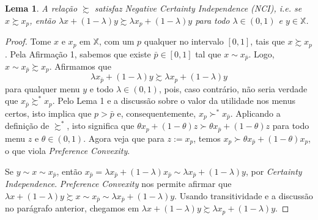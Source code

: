 \documentclass[11pt, a4paper]{article}
\theoremstyle{nonumberplain}
\newtheorem{proof}{Dem.}
\theoremstyle{plain}
\theoremstyle{plain}
\theoremstyle{plain}
\newtheorem{lemma}{Lema}
\begin{document}
\begin{lemma}\label{NCI}A relação $\succsim$ satisfaz \emph{Negative Certainty Independence (NCI)}, i.e. se $x\succsim x_p$, então $\lambda x +(1-\lambda)y\succsim \lambda x_p +(1-\lambda)y$ para todo $\lambda\in(0,1)$ e $y\in \mathbb{X}$.\end{lemma}
\begin{proof}
Tome $x$ e $x_p$ em $\mathbb{X}$, com um $p$ qualquer no intervalo $[0,1]$, tais que $x\succsim x_p$. Pela Afirmação 1, sabemos que existe $\bar{p}\in [0,1]$ tal que $x\sim x_{\bar{p}}$. Logo, $x\sim x_{\bar{p}}\succsim x_p$. Afirmamos que $$\lambda x_{\bar{p}} +(1-\lambda)y\succsim \lambda x_p +(1-\lambda)y$$
para qualquer menu $y$ e todo $\lambda\in (0,1)$, pois, caso contrário, não seria verdade que $x_{\bar{p}}\succsim^*x_p$. Pelo Lema 1 e a discussão sobre o valor da utilidade nos menus certos, isto implica que $p>\bar{p}$ e, consequentemente, $x_p\succ^*x_{\bar{p}}$. Aplicando a definição de $\succsim^*$, isto significa que $\theta x_p + (1-\theta)z\succ \theta x_{\bar{p}}+(1-\theta)z$ para todo menu $z$ e $\theta\in (0,1)$. Agora veja que para $z:=x_p$, temos $x_p\succ \theta x_{\bar{p}} + (1-\theta)x_p$, o que viola \emph{Preference Convexity}.

Se $y\sim x\sim x_{\bar{p}}$, então $x_{\bar{p}}=\lambda x_{\bar{p}} + (1-\lambda)x_{\bar{p}}\sim\lambda x_{\bar{p}}+(1-\lambda)y$, por \emph{Certainty Independence}. \emph{Preference Convexity} nos permite afirmar que $\lambda x+(1-\lambda)y \succsim x \sim x_{\bar{p}} \sim \lambda x_{\bar{p}}+(1-\lambda)y$. Usando transitividade e a discussão no parágrafo anterior, chegamos em $\lambda x+(1-\lambda)y\succsim \lambda x_p + (1-\lambda)y$. 


\end{proof}
\end{document}
